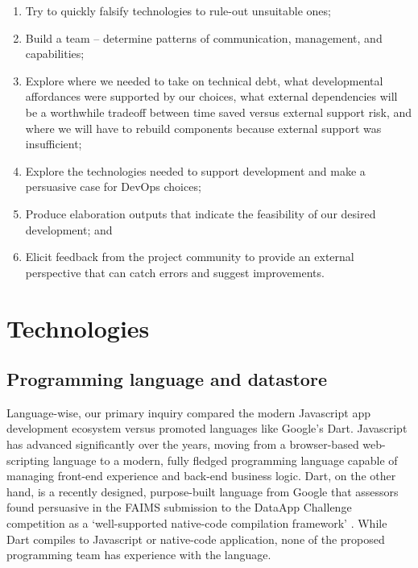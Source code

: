 \documentclass{faims3_report}
\begin{document}
\begin{enumerate}
\item Try to quickly falsify technologies to rule-out unsuitable ones;
\item Build a team -- determine patterns of communication, management, and
  capabilities;
 
\item Explore where we needed to take on technical debt, what developmental
  affordances were supported by our choices, what external dependencies
  will be a worthwhile tradeoff between time saved versus external
  support risk, and where we will have to rebuild components because
  external support was insufficient;
 
\item Explore the technologies needed to support development and make a
  persuasive case for DevOps choices;
 
\item Produce elaboration outputs that indicate the feasibility of our
  desired development; and
 
\item Elicit feedback from the project community to provide an external
  perspective that can catch errors and suggest improvements.
 
\end{enumerate}

\chapter{Technologies}

\section{Programming language and
datastore}

Language-wise, our primary inquiry compared the modern Javascript app
development ecosystem versus promoted languages like Google's Dart.
Javascript has advanced significantly over the years, moving from a
browser-based web-scripting language to a modern, fully fledged
programming language capable of managing front-end experience and
back-end business logic. Dart, on the other hand, is a recently
designed, purpose-built language from Google that assessors found
persuasive in the FAIMS submission to the DataApp Challenge competition
as a `well-supported native-code compilation framework'
\autocite{Bureau_of_Reclamation2017-xl}. While Dart compiles to Javascript or native-code application,
none of the proposed programming team has experience with the language.
\end{document}
